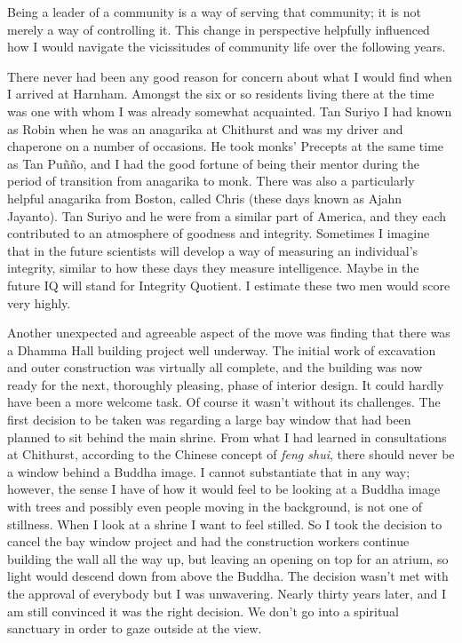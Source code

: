 Being a leader of a community is a way of serving that community; it is
not merely a way of controlling it. This change in perspective helpfully
influenced how I would navigate the vicissitudes of community life over
the following years.

There never had been any good reason for concern about what I would find
when I arrived at Harnham. Amongst the six or so residents living there
at the time was one with whom I was already somewhat acquainted. Tan
Suriyo I had known as Robin when he was an anagarika at Chithurst and
was my driver and chaperone on a number of occasions. He took monks'
Precepts at the same time as Tan Puñño, and I had the good fortune of
being their mentor during the period of transition from anagarika to
monk. There was also a particularly helpful anagarika from Boston,
called Chris (these days known as Ajahn Jayanto). Tan Suriyo and he were
from a similar part of America, and they each contributed to an
atmosphere of goodness and integrity. Sometimes I imagine that in the
future scientists will develop a way of measuring an individual's
integrity, similar to how these days they measure intelligence. Maybe in
the future IQ will stand for Integrity Quotient. I estimate these two
men would score very highly.

Another unexpected and agreeable aspect of the move was finding that
there was a Dhamma Hall building project well underway. The initial
work of excavation and outer construction was virtually all complete,
and the building was now ready for the next, thoroughly pleasing, phase
of interior design. It could hardly have been a more welcome task. Of
course it wasn't without its challenges. The first decision to be taken
was regarding a large bay window that had been planned to sit behind the
main shrine. From what I had learned in consultations at Chithurst,
according to the Chinese concept of \emph{feng shui}, there should never
be a window behind a Buddha image. I cannot substantiate that in any
way; however, the sense I have of how it would feel to be looking at a
Buddha image with trees and possibly even people moving in the
background, is not one of stillness. When I look at a shrine I want to
feel stilled. So I took the decision to cancel the bay window project
and had the construction workers continue building the wall all the way
up, but leaving an opening on top for an atrium, so light would descend
down from above the Buddha. The decision wasn't met with the approval of
everybody but I was unwavering. Nearly thirty years later, and I am
still convinced it was the right decision. We don't go into a spiritual
sanctuary in order to gaze outside at the view.

